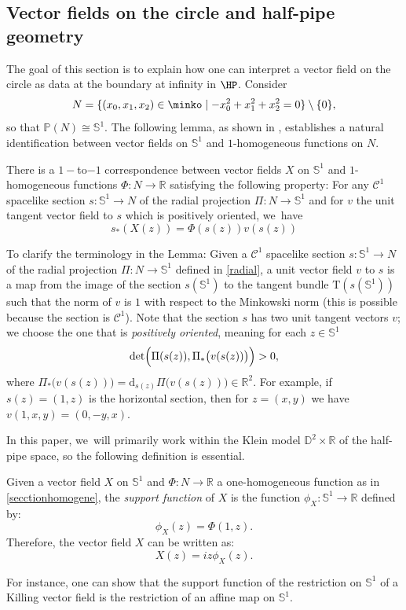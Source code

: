 \subsection{Vector fields on the circle and half-pipe geometry}
The goal of this section is to explain how one can interpret a vector field on the circle as data at the boundary at infinity in $\HP$. Consider
\[
N=\{(x_0,x_1,x_2)\in\minko\mid -x_0^2+x_1^2+x_2^2=0\}\setminus\{0\},\]
so that $\mathbb{P}(N)\cong\mathbb{S}^1$. The following lemma, as shown in \cite{BS17}, establishes a natural identification between vector fields on $\mathbb{S}^1$ and $1$-homogeneous functions on $N$.

\begin{lemma}[{\cite[Lem.\,2.23]{BS17}}]\label{homogene}
There is a $1-$to$-1$ correspondence between vector fields $X$ on $\mathbb{S}^1$ and $1$-homogeneous functions $\Phi:N\to\mathbb{R}$ satisfying the following property: For any $\mathcal{C}^1$ spacelike section $s:\mathbb{S}^1\to N$ of the radial projection $\Pi:N\to\mathbb{S}^1$ and for $v$ the unit tangent vector field to
$s$ which is positively oriented, we~have
\begin{equation}\label{secctionhomogene}
s_*(X(z))=\Phi(s(z))v(s(z))
\end{equation}
\end{lemma}
To clarify the terminology in the Lemma: Given a $\mathcal{C}^1$ spacelike section $s:\mathbb{S}^1\to N$ of the radial projection $\Pi:N\to\mathbb{S}^1$ defined in \eqref{radial}, a unit vector field $v$ to $s$ is a map from the image of the section $s(\mathbb{S}^1)$ to the tangent bundle $\mathrm{T}(s(\mathbb{S}^1))$ such that the norm of $v$ is $1$ with respect to the Minkowski norm (this is possible because the section is $\mathcal{C}^1$). Note that the section $s$ has two unit tangent vectors $v$; we choose the one that is \emph{positively oriented}, meaning for each $z\in \mathbb{S}^1$
\[
\det\Bigl(\Pi(s(z)),\Pi_*\bigl(v(s(z))\bigr)\Bigr)>0,
\]
where $\Pi_*\bigl(v(s(z))\bigr)=\mathrm{d}_{s(z)}\Pi\bigl(v(s(z))\bigr)\in\mathbb{R}^2$. For example, if $s(z)=(1,z)$ is the horizontal section, then for $z=(x,y)$ we have $v(1,x,y)=(0,-y,x)$.

In this paper, we~will primarily work within the Klein model $\mathbb{D}^2\times\mathbb{R}$ of the half-pipe space, so the following definition is essential.

\begin{defi}\label{supportfunction}
Given a vector field $X$ on $\mathbb{S}^1$ and $\Phi:N\to \mathbb{R}$ a one-homogeneous function as in \eqref{secctionhomogene}, the \emph{support function} of $X$ is the function $\phi_X:\mathbb{S}^1\to \mathbb{R}$ defined by:
\[
\phi_X(z)=\Phi(1,z).
\]
Therefore, the vector field $X$ can be written as: \begin{equation}\label{supportfunction_vs_vectorfield}
X(z)=iz\phi_{X}(z).
\end{equation}
\end{defi}
For instance, one can show that the support function of the restriction on $\mathbb{S}^1$ of a Killing vector field is the restriction of an affine map on $\mathbb{S}^1$.

